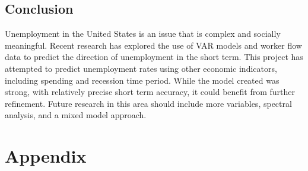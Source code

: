 \documentclass[twoside,twocolumn]{article}
\begin{document}
\subsection{Conclusion}

Unemployment in the United States is an issue that is complex and socially meaningful. Recent research has explored the use of VAR models and worker flow data to predict the direction of unemployment in the short term. This project has attempted to predict unemployment rates using other economic indicators, including spending and recession time period. While the model created was strong, with relatively precise short term accuracy, it could benefit from further refinement. Future research in this area should include more variables, spectral analysis, and a mixed model approach. 


\begin{flushleft}
\end{flushleft}
 \section*{Appendix}
 \appendix
\end{document}
